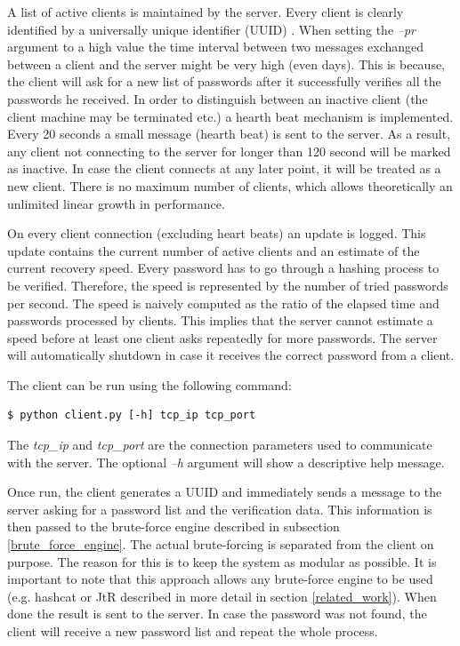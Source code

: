 \documentclass[11pt,oneside]{fithesis2}
\begin{document}
A list of active clients is maintained by the server. Every client is clearly identified by a universally unique identifier (UUID) \cite{rfc4122}. When setting the \textit{–pr} argument to a high value the time interval between two messages exchanged between a client and the server might be very high (even days). This is because, the client will ask for a new list of passwords after it successfully verifies all the passwords he received. In order to distinguish between an inactive client (the client machine may be terminated etc.) a hearth beat mechanism is implemented. Every 20 seconds a small message (hearth beat) is sent to the server. As a result, any client not connecting to the server for longer than 120 second will be marked as inactive. In case the client connects at any later point, it will be treated as a new client. There is no maximum number of clients, which allows theoretically an unlimited linear growth in performance.

On every client connection (excluding heart beats) an update is logged. This update contains the current number of active clients and an estimate of the current recovery speed. Every password has to go through a hashing process to be verified. Therefore, the speed is represented by the number of tried passwords per second. The speed is naively computed as the ratio of the elapsed time and passwords processed by clients. This implies that the server cannot estimate a speed before at least one client asks repeatedly for more passwords. The server will automatically shutdown in case it receives the correct password from a client.

The client can be run using the following command:
\begin{lstlisting}
$ python client.py [-h] tcp_ip tcp_port 
\end{lstlisting}

The \textit{tcp\_ip} and \textit{tcp\_port} are the connection parameters used to communicate with the server. The optional \textit{–h} argument will show a descriptive help message. 

Once run, the client generates a UUID and immediately sends a message to the server asking for a password list and the verification data. This information is then passed to the brute-force engine described in subsection \ref{brute_force_engine}. The actual brute-forcing is separated from the client on purpose. The reason for this is to keep the system as modular as possible. It is important to note that this approach allows any brute-force engine to be used (e.g. hashcat or JtR \cite{hashcat, jtr} described in more detail in section \ref{related_work}). When done the result is sent to the server. In case the password was not found, the client will receive a new password list and repeat the whole process.
\end{document}
